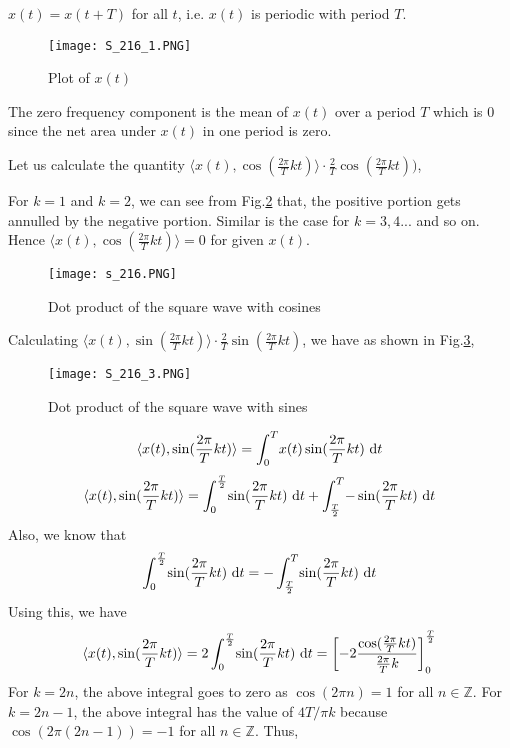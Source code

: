 \noindent
$x(t) = x(t+T)$ for all $t$, i.e. $x(t)$ is periodic with period $T$.
              
\begin{figure}[ht]\label{fig:square-wave}
\centering
\texttt{[image: S\_216\_1.PNG]} %
\caption{Plot of $x(t)$}
\end{figure}




\noindent
The zero frequency component is the  mean of $x(t)$ over a period $T$ which is $0$ since the net area under $x(t)$ in one period is zero.

\noindent
Let us calculate the quantity $\langle x(t), \cos (\frac{2\pi}{T}kt)\rangle \cdot \frac{2}{T}\cos (\frac{2\pi}{T}kt))$,


\noindent
For $k=1$ and $k=2$, we can see from Fig.\ref{fig:square-dot-cosine} that, the positive portion gets annulled by the negative portion. Similar is the case for $k=3, 4...$ and so on. Hence $\langle x(t), \cos (\frac{2\pi}{T}kt)\rangle= 0$ for given $x(t)$.


\begin{figure}[ht]\label{fig:square-dot-cosine}
\centering
\texttt{[image: s\_216.PNG]} %
\caption{Dot product of the square wave with cosines}	
\end{figure}

\noindent
Calculating  $\langle x(t), \sin (\frac{2\pi}{T}kt)\rangle \cdot \frac{2}{T}\sin (\frac{2\pi}{T}kt)$, we have as shown in Fig.\ref{fig:square-dot-sine},

\begin{figure}[ht]\label{fig:square-dot-sine}
\centering
\texttt{[image: S\_216\_3.PNG]} %
\caption{Dot product of the square wave with sines}	
\end{figure}
\begin{equation*} \langle x(t), \sin (\frac{2\pi}{T}kt)\rangle = \int_{0}^{T} \! x(t)\sin (\frac{2\pi}{T}kt) \ \mathrm{d} t\end{equation*}
\begin{equation*} \langle x(t), \sin (\frac{2\pi}{T}kt)\rangle = \int_{0}^{\frac{T}{2}} \! \sin (\frac{2\pi}{T}kt) \ \mathrm{d} t + \int_{\frac{T}{2}}^{T} \! {-\sin (\frac{2\pi}{T}kt)} \ \mathrm{d} t \end{equation*}
\noindent
Also, we know that 
 \begin{equation*}\int_{0}^{\frac{T}{2}} \! \sin (\frac{2\pi}{T}kt) \ \mathrm{d} t = -\int_{\frac{T}{2}}^{T} \! \sin (\frac{2\pi}{T}kt) \ \mathrm{d} t \end{equation*}
\noindent
Using this, we have
\begin{equation*} \langle x(t), \sin (\frac{2\pi}{T}kt)\rangle = 2\int_{0}^{\frac{T}{2}} \! \sin (\frac{2\pi}{T}kt) \ \mathrm{d} t = \left[-2\frac{\cos (\frac{2\pi}{T}kt)}{\frac{2\pi}{T}k}\right]_0^\frac{T}{2}\end{equation*}
For $k = 2n$, the above integral goes to zero as $\cos ({2\pi}n) = 1$ for all $n \in \mathbb{Z}$.
For $k = 2n-1$, the above integral has the value of $4T/\pi k$ because $\cos(2{\pi}(2n-1)) = -1$ for all $n \in \mathbb{Z}$. Thus,

